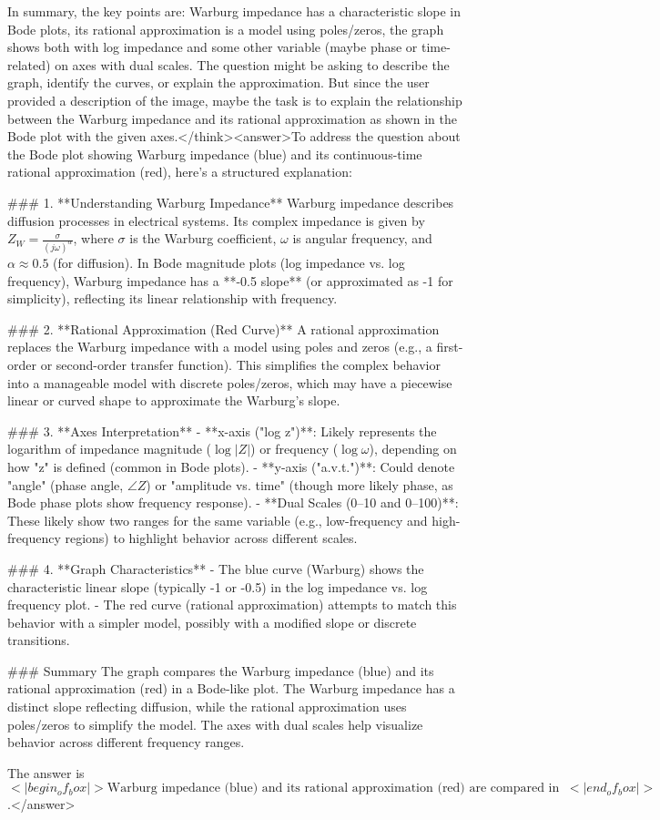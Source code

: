 In summary, the key points are: Warburg impedance has a characteristic slope in Bode plots, its rational approximation is a model using poles/zeros, the graph shows both with log impedance and some other variable (maybe phase or time-related) on axes with dual scales. The question might be asking to describe the graph, identify the curves, or explain the approximation. But since the user provided a description of the image, maybe the task is to explain the relationship between the Warburg impedance and its rational approximation as shown in the Bode plot with the given axes.</think><answer>To address the question about the Bode plot showing Warburg impedance (blue) and its continuous-time rational approximation (red), here's a structured explanation:  

### 1. **Understanding Warburg Impedance**  
Warburg impedance describes diffusion processes in electrical systems. Its complex impedance is given by \( Z_W = \frac{\sigma}{(j\omega)^\alpha} \), where \( \sigma \) is the Warburg coefficient, \( \omega \) is angular frequency, and \( \alpha \approx 0.5 \) (for diffusion). In Bode magnitude plots (log impedance vs. log frequency), Warburg impedance has a **-0.5 slope** (or approximated as -1 for simplicity), reflecting its linear relationship with frequency.  

### 2. **Rational Approximation (Red Curve)**  
A rational approximation replaces the Warburg impedance with a model using poles and zeros (e.g., a first-order or second-order transfer function). This simplifies the complex behavior into a manageable model with discrete poles/zeros, which may have a piecewise linear or curved shape to approximate the Warburg’s slope.  

### 3. **Axes Interpretation**  
- **x-axis ("log z")**: Likely represents the logarithm of impedance magnitude (\( \log|Z| \)) or frequency (\( \log\omega \)), depending on how "z" is defined (common in Bode plots).  
- **y-axis ("a.v.t.")**: Could denote "angle" (phase angle, \( \angle Z \)) or "amplitude vs. time" (though more likely phase, as Bode phase plots show frequency response).  
- **Dual Scales (0–10 and 0–100)**: These likely show two ranges for the same variable (e.g., low-frequency and high-frequency regions) to highlight behavior across different scales.  

### 4. **Graph Characteristics**  
- The blue curve (Warburg) shows the characteristic linear slope (typically -1 or -0.5) in the log impedance vs. log frequency plot.  
- The red curve (rational approximation) attempts to match this behavior with a simpler model, possibly with a modified slope or discrete transitions.  

### Summary  
The graph compares the Warburg impedance (blue) and its rational approximation (red) in a Bode-like plot. The Warburg impedance has a distinct slope reflecting diffusion, while the rational approximation uses poles/zeros to simplify the model. The axes with dual scales help visualize behavior across different frequency ranges.  

The answer is \(<|begin_of_box|>\text{Warburg impedance (blue) and its rational approximation (red) are compared in a Bode-like plot with log impedance and dual-axis scales.}<|end_of_box|>\).</answer>